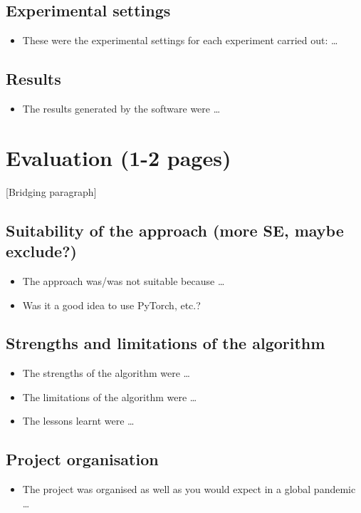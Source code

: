 \documentclass[12pt,a4paper]{article}
\begin{document}
\subsection{Experimental settings}
\begin{itemize}
    \item These were the experimental settings for each experiment carried out: \dots
\end{itemize}

\subsection{Results}
\begin{itemize}
    \item The results generated by the software were \dots
\end{itemize}

\section{Evaluation (1-2 pages)}
[Bridging paragraph]
\subsection{Suitability of the approach (more SE, maybe exclude?)}
\begin{itemize}
    \item The approach was/was not suitable because \dots
    \item Was it a good idea to use PyTorch, etc.?
\end{itemize}

\subsection{Strengths and limitations of the algorithm} 
\begin{itemize}
    \item The strengths of the algorithm were \dots
    \item The limitations of the algorithm were \dots
    \item The lessons learnt were \dots
\end{itemize}

\subsection{Project organisation}
\begin{itemize}
    \item The project was organised as well as you would expect in a global pandemic \dots
\end{itemize}
\end{document}
